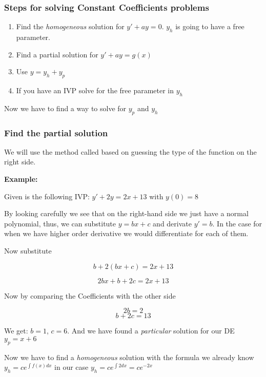 \subsubsection{Steps for solving Constant Coefficients problems}

\begin{enumerate}

    \item Find the \emph{homogeneous} solution for \(y' + ay = 0\). \(y_h\) is going
          to have a free parameter.
    
    \item Find a partial solution for \(y' + ay = g(x)\)
    
    \item Use \(y = y_h + y_p\)
    
    \item If you have an IVP solve for the free parameter in \(y_h\)

\end{enumerate}

Now we have to find a way to solve for \(y_p\) and \(y_h\)

\subsubsection{Find the partial solution}

We will use the method called based on guessing the type of the function on the right side.

\textbf{Example: }

Given is the following IVP: \(y' + 2y = 2x + 13\) with \(y(0) = 8\)

By looking carefully we see that on the right-hand side we just have a normal polynomial,
thus, we can substitute \(y = bx + c\) and derivate \(y' = b\). In the case for when we have higher
order derivative we would differentiate for each of them. 

Now substitute

\[
    b + 2(bx + c) = 2x + 13
\]

\[
    2bx + b + 2c = 2x + 13
\]

Now by comparing the Coefficients with the other side 

\[
    2b = 2
\]
\[
    b + 2c = 13
\]

We get: \(b = 1\), \(c = 6\). And we have found a \emph{particular} solution for our DE 
\(y_p = x + 6\)

Now we have to find a \emph{homogeneous} solution with the formula we already know
\(y_h = c e^{\int f(x)dx}\) in our case \(y_h = c e^{\int 2dx} = ce^{-2x}\)


